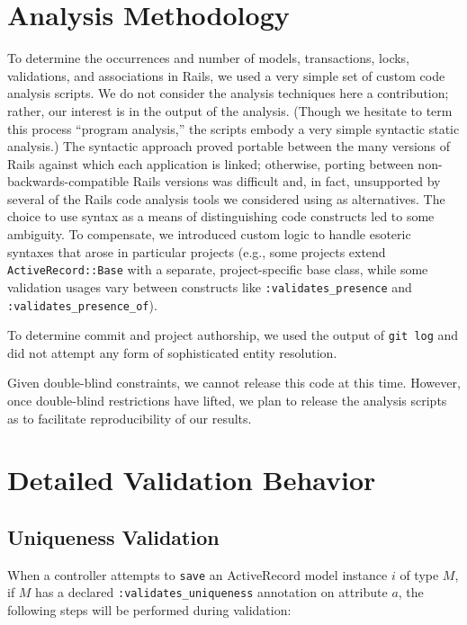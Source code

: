 \section{Analysis Methodology}
\label{sec:appendix-methodology}

To determine the occurrences and number of models, transactions, locks, validations, and associations in Rails, we used a very simple set of custom code analysis scripts. We do not consider the analysis techniques here a contribution; rather, our interest is in the output of the analysis.  (Though we hesitate to term this process ``program analysis,'' the scripts embody a very simple syntactic static analysis.) The syntactic approach proved portable between the many versions of Rails against which each application is linked; otherwise, porting between non-backwards-compatible Rails versions was difficult and, in fact, unsupported by several of the Rails code analysis tools we considered using as alternatives. The choice to use syntax as a means of distinguishing code constructs led to some ambiguity. To compensate, we introduced custom logic to handle esoteric syntaxes that arose in particular projects (e.g., some projects extend \texttt{ActiveRecord::Base} with a separate, project-specific base class, while some validation usages vary between constructs like \texttt{:validates\_presence} and \texttt{:validates\_presence\_of}).

To determine commit and project authorship, we used the output of \texttt{git log} and did not attempt any form of sophisticated entity resolution.

Given double-blind constraints, we cannot release this code at this time. However, once double-blind restrictions have lifted, we plan to release the analysis scripts as to facilitate reproducibility of our results.

\section{Detailed Validation Behavior}

\subsection{Uniqueness Validation}
\label{sec:appendix-uniqueness-behavior}

When a controller attempts to \texttt{save} an ActiveRecord model instance $i$ of type $M$, if $M$ has a declared \texttt{:validates\_uniqueness} annotation on attribute $a$, the following steps will be performed during validation:

